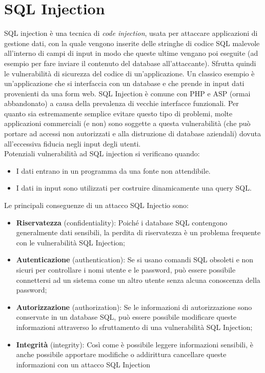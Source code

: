 \chapter{SQL Injection}

SQL injection è una tecnica di \textit{code injection}, usata per attaccare
applicazioni di gestione
dati, con la quale vengono inserite delle stringhe di codice SQL malevole
all'interno di campi
di input in modo che queste ultime vengano poi eseguite
(ad esempio per fare inviare il contenuto del database all'attaccante).
Sfrutta quindi le vulnerabilità di sicurezza del codice
di un'applicazione. Un classico esempio è un'applicazione che si interfaccia
con un database
e che prende in input dati provenienti da una form web.
SQL Injection è comune con PHP e ASP (ormai abbandonato) a causa della
prevalenza di
vecchie interfacce funzionali.
Per quanto sia estremamente semplice evitare questo tipo di problemi,
molte applicazioni
commerciali (e non) sono soggette a questa vulnerabilità
(che può portare ad accessi non
autorizzati e alla distruzione di database aziendali) dovuta all'eccessiva
fiducia negli input
degli utenti.\\

Potenziali vulnerabilità ad SQL injection si verificano quando:

\begin{itemize}
    \item I dati entrano in un programma da una fonte non attendibile.
    \item I dati in input sono utilizzati per costruire
          dinamicamente una query SQL.
\end{itemize}

Le principali conseguenze di un attacco SQL Injectio sono:

\begin{itemize}
    \item \textbf{Riservatezza} (confidentiality):
          Poiché i database SQL contengono generalmente dati
          sensibili, la perdita di riservatezza è un problema frequente con le
          vulnerabilità SQL
          Injection;
    \item \textbf{Autenticazione} (authentication): Se si usano comandi SQL
          obsoleti e non sicuri per controllare i
          nomi utente e le password, può essere possibile connettersi ad un sistema
          come un
          altro utente senza alcuna conoscenza della password;
    \item \textbf{Autorizzazione} (authorization): Se le informazioni di
          autorizzazione sono conservate
          in un database SQL, può essere possibile modificare queste informazioni
          attraverso
          lo sfruttamento di una vulnerabilità SQL Injection;
    \item \textbf{Integrità} (integrity): Così come è possibile leggere
          informazioni sensibili, è anche
          possibile apportare modifiche o addirittura cancellare queste informazioni
          con un
          attacco SQL Injection
\end{itemize}


